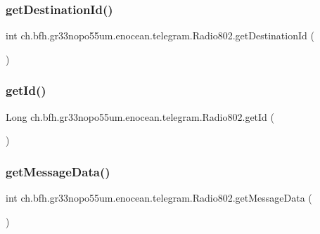 \subsubsection{\texorpdfstring{get\+Destination\+Id()}{getDestinationId()}}
{\footnotesize\ttfamily int ch.\+bfh.\+gr33nopo55um.\+enocean.\+telegram.\+Radio802.\+get\+Destination\+Id (\begin{DoxyParamCaption}{ }\end{DoxyParamCaption})}

\hypertarget{classch_1_1bfh_1_1gr33nopo55um_1_1enocean_1_1telegram_1_1_radio802_a912e19d8c60b78b03fca8b9292e56cec}{}\label{classch_1_1bfh_1_1gr33nopo55um_1_1enocean_1_1telegram_1_1_radio802_a912e19d8c60b78b03fca8b9292e56cec} 
\subsubsection{\texorpdfstring{get\+Id()}{getId()}}
{\footnotesize\ttfamily Long ch.\+bfh.\+gr33nopo55um.\+enocean.\+telegram.\+Radio802.\+get\+Id (\begin{DoxyParamCaption}{ }\end{DoxyParamCaption})}

\hypertarget{classch_1_1bfh_1_1gr33nopo55um_1_1enocean_1_1telegram_1_1_radio802_a9d723595d6d66dca270e800c1b8442a1}{}\label{classch_1_1bfh_1_1gr33nopo55um_1_1enocean_1_1telegram_1_1_radio802_a9d723595d6d66dca270e800c1b8442a1} 
\subsubsection{\texorpdfstring{get\+Message\+Data()}{getMessageData()}}
{\footnotesize\ttfamily int ch.\+bfh.\+gr33nopo55um.\+enocean.\+telegram.\+Radio802.\+get\+Message\+Data (\begin{DoxyParamCaption}{ }\end{DoxyParamCaption})}

